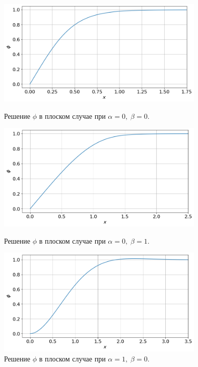 \begin{figure}[!tp]
    \centering
    \includegraphics[width=0.89\textwidth]{figures/result_volumes.png}
    \vspace{-0.3cm}
    \caption{Решение $\phi$ в плоском случае при $\alpha = 0, \; \beta = 0$.}
    \label{fig:result_volumes}
    \vspace{0.5cm}

    \includegraphics[width=0.89\textwidth]{figures/result_volumes_p.png}
    \vspace{-0.3cm}
    \caption{Решение $\phi$ в плоском случае при $\alpha = 0, \; \beta = 1$.}
    \label{fig:result_volumes_p}
    \vspace{0.5cm}
    
    \includegraphics[width=0.89\textwidth]{figures/result_volumes_bi.png}
    \vspace{-0.3cm}
    \caption{Решение $\phi$ в плоском случае при $\alpha = 1, \; \beta = 0$.}
    \label{fig:result_volumes_bi}
\end{figure}

